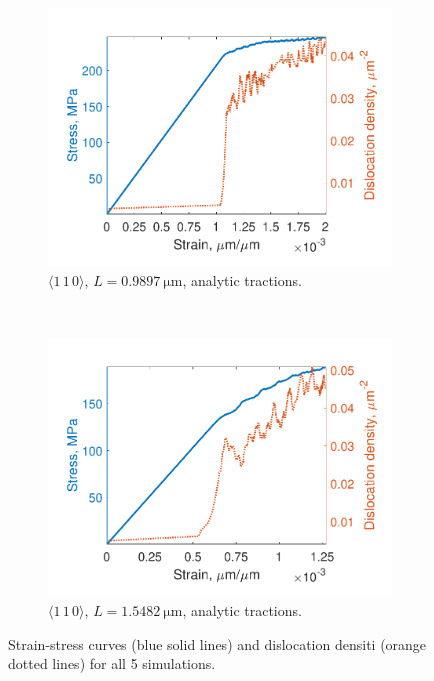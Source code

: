 \begin{figure}
    \begin{subfigure}[t]{0.45\linewidth}
        \centering
        \includegraphics[width=\linewidth]{../data/density_11-Mar-2021_4_tensile_ni_110.pdf}
        \caption{$\langle 1\, 1\, 0 \rangle$, $L = \SI{0.9897}{\micro\metre}$, analytic tractions.}
        \label{sf:stressDens4}
    \end{subfigure}
    ~
    \begin{subfigure}[t]{0.45\linewidth}
        \centering
        \includegraphics[width=\linewidth]{../data/density_16-Mar-2021_4_tensile_ni_110.pdf}
        \caption{$\langle 1\, 1\, 0 \rangle$, $L = \SI{1.5482}{\micro\metre}$, analytic tractions.}
        \label{sf:stressDens5}
    \end{subfigure}
    \caption{Strain-stress curves (blue solid lines) and dislocation densiti (orange dotted lines) for all 5 simulations.}
    \label{f:stressDens}
\end{figure}

